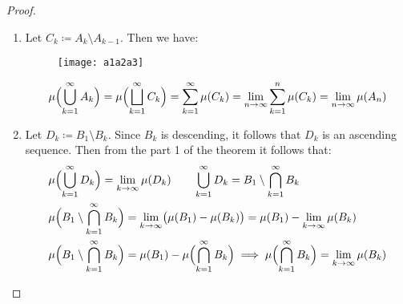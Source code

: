 \begin{proof}
    \begin{enumerate}
        \item {
            Let $C_k \coloneqq A_k \setminus A_{k-1}$. Then we have:

            \begin{figure*}[h]
                \centering
                \texttt{[image: a1a2a3]}
            \end{figure*}

            \[
                \mu\Bigl(\bigcup_{k=1}^\infty A_k\Bigr) =
                \mu\Bigl(\bigsqcup_{k=1}^\infty C_k\Bigr) =
                \sum_{k=1}^\infty \mu(C_k) =
                \lim_{n \to \infty} \sum_{k=1}^n \mu(C_k) = \lim_{n \to \infty} \mu(A_n)
            \]
        }
        \item {
            Let $D_k \coloneqq B_1 \setminus B_k$. 
            Since $B_k$ is descending, it follows that $D_k$ is an ascending sequence. Then from the part 1 of the theorem it follows that:
            \begin{align*}
                &
                \mu\Bigl(\bigcup_{k=1}^\infty D_k\Bigr) = \lim_{k \to \infty} \mu(D_k)
                \qquad
                \bigcup_{k=1}^\infty D_k = B_1 \setminus \bigcap_{k=1}^\infty B_k
                \\&
                \mu\Bigl(B_1 \setminus \bigcap_{k=1}^\infty B_k\Bigr) =
                \lim_{k \to \infty}\bigl(\mu(B_1) - \mu(B_k)\bigr) =
                \mu(B_1) - \lim_{k \to \infty} \mu(B_k)
                \\&
                \mu\Bigl(B_1 \setminus \bigcap_{k=1}^\infty B_k\Bigr) =
                \mu(B_1) - \mu\Bigl(\bigcap_{k=1}^\infty B_k\Bigr) \implies
                \mu\Bigl(\bigcap_{k=1}^\infty B_k\Bigr) = \lim_{k \to \infty} \mu(B_k)
            \end{align*}
        }
    \end{enumerate}    
\end{proof}

